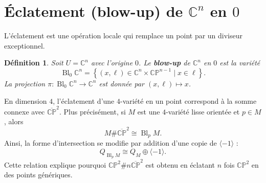 \documentclass{article}
\newtheorem{definition}{Définition}
\DeclareMathOperator{\Bl}{Bl}
\newcommand{\CP}{\mathbb{C}\mathbb{P}}
\newcommand{\C}{\mathbb{C}}
\begin{document}
\section{Éclatement (blow-up) de $\mathbb{C}^n$ en $0$}

L'éclatement est une opération locale qui remplace un point par un diviseur exceptionnel.

\begin{definition}
Soit $U = \C^n$ avec l'origine $0$. Le \textbf{blow-up} de $\C^n$ en $0$ est la variété
\[
\Bl_0 \C^n = \left\{ (x,\ell) \in \C^n \times \CP^{n-1} \mid x \in \ell \right\}.
\]
La projection $\pi : \Bl_0 \C^n \to \C^n$ est donnée par $(x,\ell) \mapsto x$.
\end{definition}


En dimension $4$, l'éclatement d'une $4$-variété en un point correspond à la somme connexe avec $\overline{\CP}^2$. Plus précisément, si $M$ est une $4$-variété lisse orientée et $p \in M$, alors
\[
M \# \overline{\CP}^2 \cong \Bl_p M.
\]
Ainsi, la forme d'intersection se modifie par addition d'une copie de $\langle -1 \rangle$ :
\[
Q_{\Bl_p M} \cong Q_M \oplus \langle -1 \rangle.
\]
Cette relation explique pourquoi $\CP^2 \# n\overline{\CP}^2$ est obtenu en éclatant $n$ fois $\CP^2$ en des points génériques.
\end{document}
